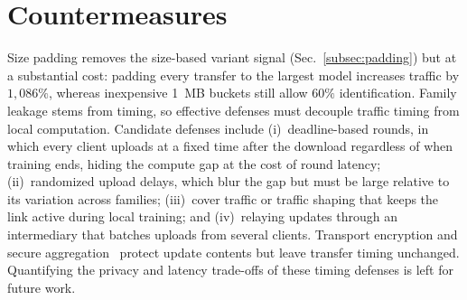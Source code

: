 \section{Countermeasures}
\label{sec:discussion}
Size padding removes the size-based variant signal (Sec.~\ref{subsec:padding}) but at a
substantial cost: padding every transfer to the largest model increases traffic
by $1{,}086\%$, whereas inexpensive 1~MB buckets still allow $60\%$
identification. Family leakage stems from timing, so effective defenses must
decouple traffic timing from local computation. Candidate defenses include
(i)~deadline-based rounds, in which every client uploads at a fixed time after
the download regardless of when training ends, hiding the compute gap at the
cost of round latency; (ii)~randomized upload delays, which blur the gap but
must be large relative to its variation across families; (iii)~cover traffic or
traffic shaping that keeps the link active during local training; and
(iv)~relaying updates through an intermediary that batches uploads from several
clients. Transport encryption and secure aggregation~\cite{TODO-secure-aggregation}
protect update contents but leave transfer timing unchanged. Quantifying the
privacy and latency trade-offs of these timing defenses is left for future work.
